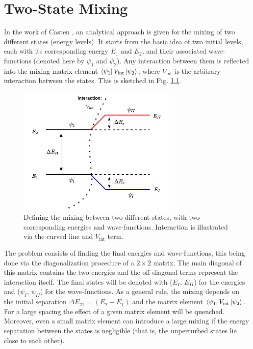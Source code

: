 
\appendix

\chapter{Two-State Mixing}
\label{appendix:two-state}

In the work of Casten \cite{casten2000nuclear}, an analytical approach is given for the mixing of two different states (energy levels). It starts from the basic idea of two initial levels, each with its corresponding energy $E_1$ and $E_2$, and their associated wave-functions (denoted here by $\psi_1$ and $\psi_2$). Any interaction between them is reflected into the mixing matrix element $\bra{\psi_1}V_\text{int}\ket{\psi_2}$, where $V_\text{int}$ is the arbitrary interaction between the states. This is sketched in Fig. \ref{two-state-mixing-scheme}.
\begin{figure}
    \centering
    \includegraphics[width=0.7\textwidth]{Chapters/Figures/two-state-mixing.pdf}
    \caption{Defining the mixing between two different states, with two corresponding energies and wave-functions. Interaction is illustrated via the curved line and $V_\text{int}$ term.}
    \label{two-state-mixing-scheme}
\end{figure}

The problem consists of finding the final energies and wave-functions, this being done via the diagonalization procedure of a $2\times 2$ matrix. The main diagonal of this matrix contains the two energies and the off-diagonal terms represent the interaction itself. The final states will be denoted with ($E_I$, $E_{II}$) for the energies and ($\psi_I$, $\psi_{II}$) for the wave-functions. As a general rule, the mixing depends on the initial separation $\Delta E_{21}=(E_2-E_1)$ and the matrix element $\bra{\psi_1}V_\text{int}\ket{\psi_2}$. For a large spacing the effect of a given matrix element will be quenched. Moreover, even a small matrix element can introduce a large mixing if the energy separation between the states is negligible (that is, the unperturbed states lie close to each other). 

